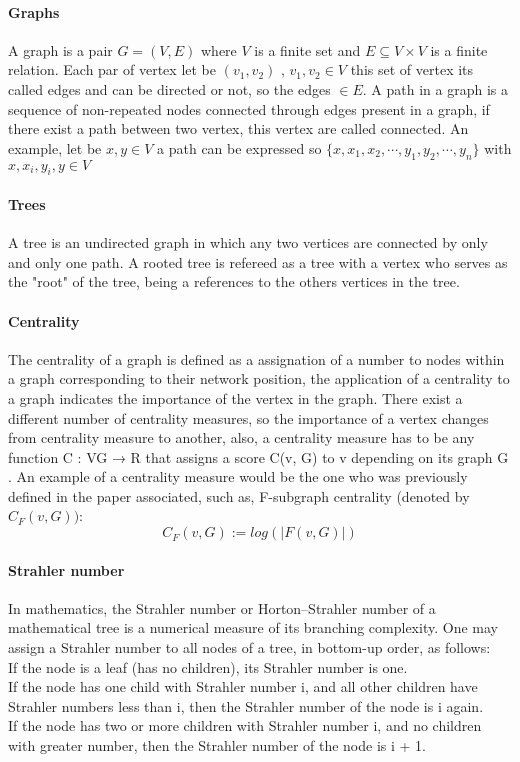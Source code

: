 

\paragraph{Graphs} A graph is a pair $G = (V, E)$ where $V$ is a finite set and $E \subseteq V\times V$ is a finite relation. Each par of vertex let be $(v_{1},v_{2})$ , $v_{1},v_{2} \in V$ this set of vertex its called edges and can be directed or not, so the edges $\in E$. A path in a graph is a sequence of non-repeated nodes connected through edges present in a graph, if there exist a path between two vertex, this vertex are called connected. An example, let be $x,y \in V$ a path can be expressed so $\{x,x_{1},x_{2},\cdots,y_{1},y_{2},\cdots,y_{n} \}$ with $x,x_{i},y_{i},y \in V$

\paragraph{Trees} A tree is an undirected graph in which any two vertices are connected by only and only one path. A rooted tree is refereed as a tree with a vertex who serves as the "root" of the tree, being a references to the others  vertices in the tree.  

\paragraph{Centrality} The centrality of a graph is defined as a assignation of a number to nodes within a graph corresponding to their network position, the application of a centrality to a graph indicates the importance of the vertex in the graph. There exist a different number of centrality measures, so the importance of a vertex changes from centrality measure to another, also, a centrality measure has to be any function C : VG → R that assigns a score C(v, G) to v depending on its graph G . An example of a centrality measure would be the one who was previously defined in the paper associated, such as, F-subgraph
centrality (denoted by $C_{F} (v, G))$:
\begin{equation}
    C_{F} (v, G) := log (|F(v, G)|)
\end{equation}
\paragraph{Strahler number} In mathematics, the Strahler number or Horton–Strahler number of a mathematical tree is a numerical measure of its branching complexity. One may assign a Strahler number to all nodes of a tree, in bottom-up order, as follows:\\
If the node is a leaf (has no children), its Strahler number is one.\\
If the node has one child with Strahler number i, and all other children have Strahler numbers less than i, then the Strahler number of the node is i again.\\
If the node has two or more children with Strahler number i, and no children with greater number, then the Strahler number of the node is i + 1.


